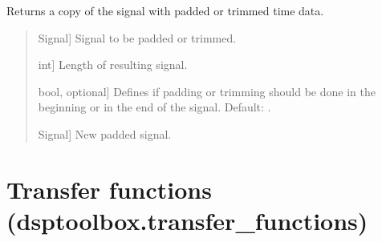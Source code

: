 \documentclass[letterpaper,10pt,english]{sphinxmanual}
\begin{document}
\begin{fulllineitems}
\label{\detokenize{modules/dsptoolbox.standard_functions:dsptoolbox.standard_functions.pad_trim}}
\pysigstartsignatures
{}
\pysigstopsignatures
\sphinxAtStartPar
Returns a copy of the signal with padded or trimmed time data.
\begin{quote}\begin{description}
\begin{description}
\sphinxlineitem{\sphinxstylestrong{signal}}{[}Signal{]}
\sphinxAtStartPar
Signal to be padded or trimmed.

\sphinxlineitem{\sphinxstylestrong{desired\_length\_samples}}{[}int{]}
\sphinxAtStartPar
Length of resulting signal.

\sphinxlineitem{\sphinxstylestrong{in\_the\_end}}{[}bool, optional{]}
\sphinxAtStartPar
Defines if padding or trimming should be done in the beginning or
in the end of the signal. Default: .

\end{description}

\begin{description}
\sphinxlineitem{\sphinxstylestrong{new\_signal}}{[}Signal{]}
\sphinxAtStartPar
New padded signal.

\end{description}

\end{description}\end{quote}

\end{fulllineitems}


\sphinxstepscope


\section{Transfer functions (dsptoolbox.transfer\_functions)}
\label{\detokenize{modules/dsptoolbox.transfer_functions:module-dsptoolbox.transfer_functions}}\label{\detokenize{modules/dsptoolbox.transfer_functions:transfer-functions-dsptoolbox-transfer-functions}}\label{\detokenize{modules/dsptoolbox.transfer_functions::doc}}
\end{document}
